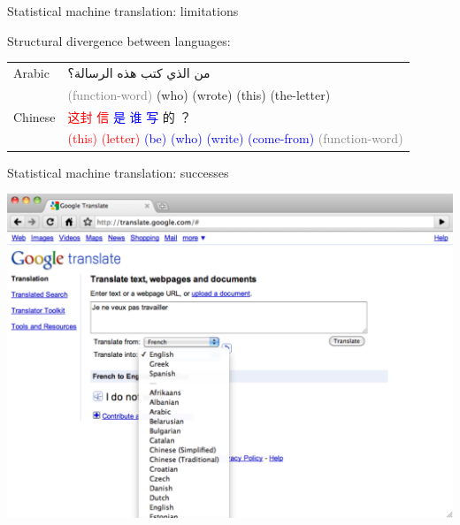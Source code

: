 \documentclass{beamer}
\newenvironment{CJK}{\fontspec[Scale=0.9]{PMingLiU}}{}
\newenvironment{Geeza}{\fontspec[Scale=0.9]{Geeza Pro}}{}
\begin{document}
\begin{frame}[t]{Statistical machine translation: limitations}
\begin{exampleblock}{Structural divergence between languages:}
\begin{table}
{\begin{tabular}{|l|l|}
      \hline
      Arabic   & \begin{Geeza}من الذي كتب هذه الرسالة؟\end{Geeza} \\
               & \textcolor{gray}{(function-word)} (who) (wrote) (this) (the-letter) \\
      \hline
      Chinese  & \begin{CJK}\textcolor{red}{这封  信}  \textcolor{blue}{是  谁  写}  的 ？\end{CJK} \\
               & \textcolor{red}{(this) (letter)} \textcolor{blue}{(be) (who) (write) (come-from)} \textcolor{gray}{(function-word)} \\
      \hline
    \end{tabular}
  }
  \end{table}
\end{exampleblock}
\end{frame}

\begin{frame}[t]{Statistical machine translation: successes}
\begin{center}
  \includegraphics[scale=0.35]{GoogleTranslateLanguages.pdf}
\end{center}
\end{frame}
\end{document}
